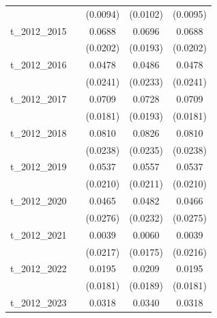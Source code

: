\begin{table}[htbp]
\begin{tabular}{l*{4}{c}}
            &                     &    (0.0094)         &    (0.0102)         &    (0.0095)         \\
[1em]
t\_2012\_2015 &                     &      0.0688\sym{***}&      0.0696\sym{***}&      0.0688\sym{***}\\
            &                     &    (0.0202)         &    (0.0193)         &    (0.0202)         \\
[1em]
t\_2012\_2016 &                     &      0.0478\sym{**} &      0.0486\sym{**} &      0.0478\sym{**} \\
            &                     &    (0.0241)         &    (0.0233)         &    (0.0241)         \\
[1em]
t\_2012\_2017 &                     &      0.0709\sym{***}&      0.0728\sym{***}&      0.0709\sym{***}\\
            &                     &    (0.0181)         &    (0.0193)         &    (0.0181)         \\
[1em]
t\_2012\_2018 &                     &      0.0810\sym{***}&      0.0826\sym{***}&      0.0810\sym{***}\\
            &                     &    (0.0238)         &    (0.0235)         &    (0.0238)         \\
[1em]
t\_2012\_2019 &                     &      0.0537\sym{**} &      0.0557\sym{***}&      0.0537\sym{**} \\
            &                     &    (0.0210)         &    (0.0211)         &    (0.0210)         \\
[1em]
t\_2012\_2020 &                     &      0.0465\sym{*}  &      0.0482\sym{**} &      0.0466\sym{*}  \\
            &                     &    (0.0276)         &    (0.0232)         &    (0.0275)         \\
[1em]
t\_2012\_2021 &                     &      0.0039         &      0.0060         &      0.0039         \\
            &                     &    (0.0217)         &    (0.0175)         &    (0.0216)         \\
[1em]
t\_2012\_2022 &                     &      0.0195         &      0.0209         &      0.0195         \\
            &                     &    (0.0181)         &    (0.0189)         &    (0.0181)         \\
[1em]
t\_2012\_2023 &                     &      0.0318         &      0.0340         &      0.0318         \\

\end{tabular}
\end{table}
